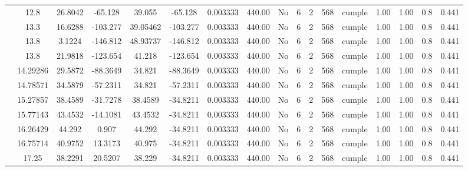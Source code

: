 \begin{table}[H]
{\begin{tabular}{|c|c|c|c|c|c|c|c|c|c|c|c|c|c|c|c|c|}
\cline{2-17}    & 12.8 & 26.8042 & -65.128 & 39.055 & -65.128 & 0.003333 & 440.00 & No  & 6   & 2   & 568 & \cellcolor[rgb]{ .776,  .937,  .808}cumple & 1.00 & 1.00 & 0.8 & 0.441 \bigstrut\\
\cline{2-17}    & 13.3 & 16.6288 & -103.277 & 39.05462 & -103.277 & 0.003333 & 440.00 & No  & 6   & 2   & 568 & \cellcolor[rgb]{ .776,  .937,  .808}cumple & 1.00 & 1.00 & 0.8 & 0.441 \bigstrut\\
\cline{2-17}    & \cellcolor[rgb]{ .851,  .882,  .949}13.8 & 3.1224 & -146.812 & 48.93737 & -146.812 & 0.003333 & 440.00 & No  & 6   & 2   & 568 & \cellcolor[rgb]{ .776,  .937,  .808}cumple & 1.00 & 1.00 & 0.8 & 0.441 \bigstrut\\
\cline{2-17}    & \cellcolor[rgb]{ .851,  .882,  .949}13.8 & 21.9818 & -123.654 & 41.218 & -123.654 & 0.003333 & 440.00 & No  & 6   & 2   & 568 & \cellcolor[rgb]{ .776,  .937,  .808}cumple & 1.00 & 1.00 & 0.8 & 0.441 \bigstrut\\
\cline{2-17}    & 14.29286 & 29.5872 & -88.3649 & 34.821 & -88.3649 & 0.003333 & 440.00 & No  & 6   & 2   & 568 & \cellcolor[rgb]{ .776,  .937,  .808}cumple & 1.00 & 1.00 & 0.8 & 0.441 \bigstrut\\
\cline{2-17}    & 14.78571 & 34.5879 & -57.2311 & 34.821 & -57.2311 & 0.003333 & 440.00 & No  & 6   & 2   & 568 & \cellcolor[rgb]{ .776,  .937,  .808}cumple & 1.00 & 1.00 & 0.8 & 0.441 \bigstrut\\
\cline{2-17}    & 15.27857 & 38.4589 & -31.7278 & 38.4589 & -34.8211 & 0.003333 & 440.00 & No  & 6   & 2   & 568 & \cellcolor[rgb]{ .776,  .937,  .808}cumple & 1.00 & 1.00 & 0.8 & 0.441 \bigstrut\\
\cline{2-17}    & 15.77143 & 43.4532 & -14.1081 & 43.4532 & -34.8211 & 0.003333 & 440.00 & No  & 6   & 2   & 568 & \cellcolor[rgb]{ .776,  .937,  .808}cumple & 1.00 & 1.00 & 0.8 & 0.441 \bigstrut\\
\cline{2-17}    & 16.26429 & 44.292 & 0.907 & 44.292 & -34.8211 & 0.003333 & 440.00 & No  & 6   & 2   & 568 & \cellcolor[rgb]{ .776,  .937,  .808}cumple & 1.00 & 1.00 & 0.8 & 0.441 \bigstrut\\
\cline{2-17}    & 16.75714 & 40.9752 & 13.3173 & 40.975 & -34.8211 & 0.003333 & 440.00 & No  & 6   & 2   & 568 & \cellcolor[rgb]{ .776,  .937,  .808}cumple & 1.00 & 1.00 & 0.8 & 0.441 \bigstrut\\
\cline{2-17}    & 17.25 & 38.2291 & 20.5207 & 38.229 & -34.8211 & 0.003333 & 440.00 & No  & 6   & 2   & 568 & \cellcolor[rgb]{ .776,  .937,  .808}cumple & 1.00 & 1.00 & 0.8 & 0.441 \bigstrut\\

\end{tabular}}
\end{table}
